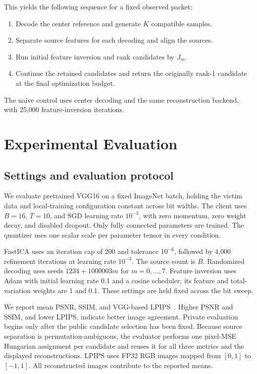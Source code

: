 \documentclass{article}
\begin{document}
This yields the following sequence for a fixed observed packet:
\begin{enumerate}
 \item Decode the center reference and generate $K$ compatible samples.
 \item Separate source features for each decoding and align the sources.
 \item Run initial feature inversion and rank candidates by $J_m$.
 \item Continue the retained candidates and return the originally
       rank-1 candidate at the final optimization budget.
\end{enumerate}
The naive control uses center decoding and the same reconstruction
backend, with 25,000 feature-inversion iterations.

\section{Experimental Evaluation}
\label{sec:experiments}
\subsection{Settings and evaluation protocol}
We evaluate pretrained VGG16 on a fixed ImageNet batch, holding the
victim data and local-training configuration constant across bit widths.
The client uses $B=16$, $T=10$, and SGD learning rate $10^{-3}$, with
zero momentum, zero weight decay, and disabled dropout. Only fully
connected parameters are trained. The quantizer uses one scalar scale
per parameter tensor in every condition.

FastICA uses an iteration cap of 200 and tolerance $10^{-6}$, followed
by 4,000 refinement iterations at learning rate $10^{-3}$. The source
count is $B$. Randomized decoding uses seeds $1234+1000003m$ for
$m=0,\ldots,7$. Feature inversion uses Adam with initial learning rate
0.1 and a cosine scheduler; its feature and total-variation weights are
1 and 0.1. These settings are held fixed across the bit sweep.

We report mean PSNR, SSIM, and VGG-based LPIPS~\cite{zhang2018lpips}.
Higher PSNR and SSIM, and lower LPIPS, indicate better image agreement.
Private evaluation begins only after the public candidate selection has
been fixed. Because source separation is permutation-ambiguous, the
evaluator performs one pixel-MSE Hungarian assignment per candidate and
reuses it for all three metrics and the displayed reconstructions.
LPIPS uses FP32 RGB images mapped from $[0,1]$ to $[-1,1]$.
All reconstructed images contribute to the reported means.
\end{document}

